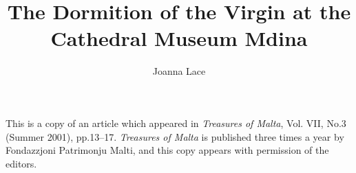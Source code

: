 \documentclass[a4paper,12pt]{article}
\begin{document}
\title{The Dormition of the Virgin at the Cathedral Museum Mdina}
\author{Joanna Lace}
\date{}
\maketitle

{\narrower
This is a copy of an article which appeared in
{\it Treasures of Malta},
Vol. VII, No.3 (Summer 2001), pp.13--17. 
{\it Treasures of Malta} is published three times a year by
Fondazzjoni Patrimonju Malti, and this copy appears with permission of
the editors.
}
\end{document}
